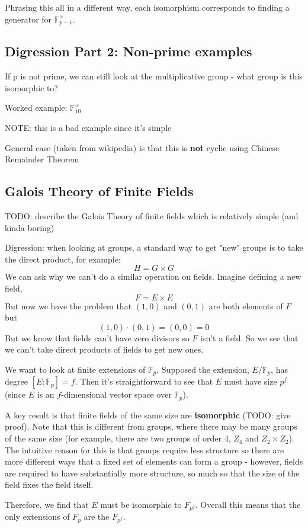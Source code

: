 \documentclass{article}
\begin{document}
Phrasing this all in a different way, each isomorphism corresponds to finding a generator for $ \mathbb{F}_{p-1}^{\times} $.

\subsection{Digression Part 2: Non-prime examples}

If p is not prime, we can still look at the multiplicative group - what group is this isomorphic to?

Worked example: $ \mathbb{F}_{10}^{\times} $

NOTE: this is a bad example since it's simple

General case (taken from wikipedia) is that this is \textbf{not} cyclic using Chinese Remainder Theorem

\subsection{Galois Theory of Finite Fields}
TODO: describe the Galois Theory of finite fields which is relatively simple (and kinda boring)

Digression: when looking at groups, a standard way to get "new" groups is to take the direct product, for example:
\begin{equation}
H = G \times G
\end{equation}
We can ask why we can't do a similar operation on fields. Imagine defining a new field,
\begin{equation}
F = E \times E
\end{equation}
But now we have the problem that \((1, 0)\) and \((0, 1)\) are both elements of $ F $ but
\begin{equation}
(1, 0) \cdot (0, 1) = (0, 0) = 0
\end{equation}
But we know that fields can't have zero divisors so $ F $ isn't a field. So we see that we can't take direct products of fields to get new ones.

We want to look at finite extensions of $ \mathbb{F}_{p} $. Supposed the extension, $ E / \mathbb{F}_{p} $, has degree $ [E : \mathbb{F}_{p}] = f $. Then it's straightforward to see that $ E $ must have size $ p^{f} $ (since $ E $ is an $f$-dimensional vector space over $\mathbb{F}_{p}$).

A key result is that finite fields of the same size are \textbf{isomorphic} (TODO: give proof). Note that this is different from groups, where there may be many groups of the same size (for example, there are two groups of order 4, $ Z_{4} $ and $ Z_{2} \times Z_{2} $). The intuitive reason for this is that groups require less structure so there are more different ways that a fixed set of elements can form a group - however, fields are required to have substantially more structure, so much so that the size of the field fixes the field itself.


Therefore, we find that $ E $ must be isomorphic to $ F_{p^{f}} $. Overall this means that the only extensions of $ F_{p} $ are the $ F_{p^{f}} $.
\end{document}
